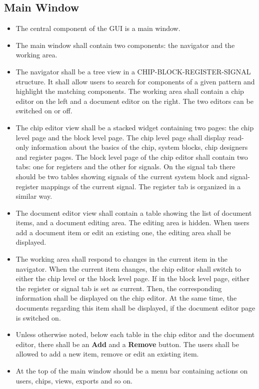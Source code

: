 \subsection{Main Window}
\begin{itemize}
\item The central component of the GUI is a main window.
\item The main window shall contain two components: the navigator and the working area.
\item The navigator shall be a tree view in a CHIP-BLOCK-REGISTER-SIGNAL structure. It shall allow users to search for components of a given pattern and highlight the matching components. The working area shall contain a chip editor on the left and a document editor on the right. The two editors can be switched on or off.
\item The chip editor view shall be a stacked widget containing two pages: the chip level page and the block level page. The chip level page shall display read-only information about the basics of the chip, system blocks, chip designers and register pages. The block level page of the chip editor shall contain two tabs: one for registers and the other for signals. On the signal tab there should be two tables showing signals of the current system block and signal-register mappings of the current signal. The register tab is organized in a similar way.
\item The document editor view shall contain a table showing the list of document items, and a document editing area. The editing area is hidden. When users add a document item or edit an existing one, the editing area shall be displayed.
\item The working area shall respond to changes in the current item in the navigator. When the current item changes, the chip editor shall switch to either the chip level or the block level page. If in the block level page, either the register or signal tab is set as current. Then, the corresponding information shall be displayed on the chip editor. At the same time, the documents regarding this item shall be displayed, if the document editor page is switched on.
\item Unless otherwise noted, below each table in the chip editor and the document editor, there shall be an \textbf{Add} and a \textbf{Remove} button. The users shall be allowed to add a new item, remove or edit an existing item. 
\item At the top of the main window should be a menu bar containing actions on users, chips, views, exports and so on.
\end{itemize}
